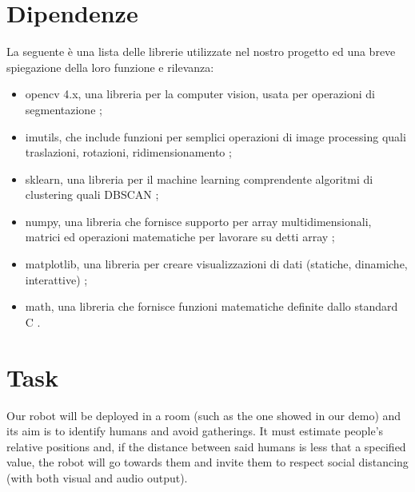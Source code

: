 \documentclass[a4paper]{article}
\begin{document}
	\section{Dipendenze}
	La seguente è una lista delle librerie utilizzate nel nostro progetto ed una breve spiegazione della loro funzione e rilevanza:
	
	\begin{itemize}
		\item opencv 4.x, una libreria per la computer vision, usata per operazioni di segmentazione \cite{opencv};
		\item imutils, che include funzioni per semplici operazioni di image processing quali traslazioni, rotazioni, ridimensionamento \cite{imutils};
		\item sklearn, una libreria per il machine learning comprendente algoritmi di clustering quali DBSCAN \cite{scikit};
		\item numpy, una libreria che fornisce supporto per array multidimensionali, matrici ed operazioni matematiche per lavorare su detti array \cite{numpy};
		\item matplotlib, una libreria per creare visualizzazioni di dati (statiche, dinamiche, interattive) \cite{matplotlib};
		\item math, una libreria che fornisce funzioni matematiche definite dallo standard C \cite{math}.
	\end{itemize}

	\section{Task}
	Our robot will be deployed in a room (such as the one showed in our demo) and its aim is to identify humans and avoid gatherings. It must estimate people's relative positions and, if the distance between said humans is less that a specified value, the robot will go towards them and invite them to respect social distancing (with both visual and audio output).
	
\end{document}
